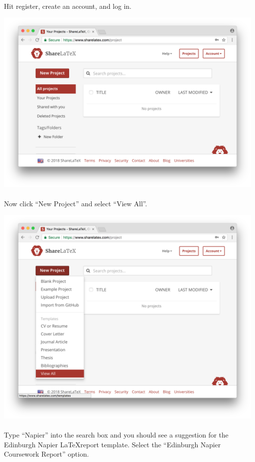 \documentclass[10pt, a4paper, twosize]{article}
\begin{document}
\paragraph{} Hit register, create an account, and log in. 

\includegraphics[width=.8\textwidth]{images/latex_login}


\paragraph{} Now click ``New Project'' and select ``View All''.

\includegraphics[width=.8\textwidth]{images/latex_new-project}

\paragraph{} Type ``Napier'' into the search box and you should see a suggestion for the Edinburgh Napier \LaTeX report template. Select the ``Edinburgh Napier Coursework Report'' option.
\end{document}
